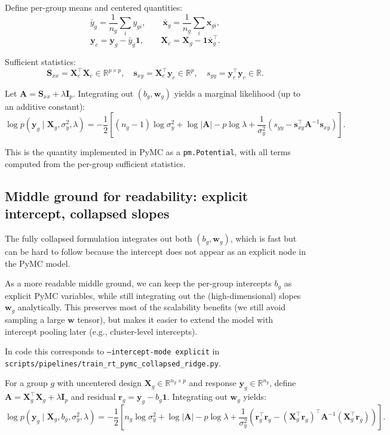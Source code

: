 \documentclass[11pt]{article}
\begin{document}
Define per-group means and centered quantities:
\[
  \bar{y}_g = \frac{1}{n_g}\sum_i y_{gi}, \qquad
  \bar{\bm{x}}_g = \frac{1}{n_g}\sum_i \bm{x}_{gi},
\]
\[
  \bm{y}_{c} = \bm{y}_g - \bar{y}_g \bm{1}, \qquad
  \bm{X}_{c} = \bm{X}_g - \bm{1}\bar{\bm{x}}_g^\top.
\]

Sufficient statistics:
\[
  \bm{S}_{xx} = \bm{X}_{c}^\top \bm{X}_{c} \in \mathbb{R}^{p\times p}, \quad
  \bm{s}_{xy} = \bm{X}_{c}^\top \bm{y}_{c} \in \mathbb{R}^{p}, \quad
  s_{yy} = \bm{y}_{c}^\top \bm{y}_{c} \in \mathbb{R}.
\]

Let $\bm{A} = \bm{S}_{xx} + \lambda \bm{I}_p$.
Integrating out $(b_g, \bm{w}_g)$ yields a marginal likelihood (up to an additive constant):
\[
  \log p(\bm{y}_g \mid \bm{X}_g, \sigma_y^2, \lambda)
  = -\frac{1}{2}\left[
    (n_g - 1)\log \sigma_y^2
    + \log|\bm{A}|
    - p\log \lambda
    + \frac{1}{\sigma_y^2}\left(s_{yy} - \bm{s}_{xy}^\top \bm{A}^{-1}\bm{s}_{xy}\right)
  \right].
\]

This is the quantity implemented in PyMC as a \texttt{pm.Potential}, with all terms computed from the per-group sufficient statistics.

\subsection{Middle ground for readability: explicit intercept, collapsed slopes}

The fully collapsed formulation integrates out both $(b_g, \bm{w}_g)$, which is fast but can be hard to follow because the intercept
does not appear as an explicit node in the PyMC model.

As a more readable middle ground, we can keep the per-group intercepts $b_g$ as explicit PyMC variables, while still integrating out
the (high-dimensional) slopes $\bm{w}_g$ analytically. This preserves most of the scalability benefits (we still avoid sampling a
large $\bm{w}$ tensor), but makes it easier to extend the model with intercept pooling later (e.g., cluster-level intercepts).

In code this corresponds to \texttt{--intercept-mode explicit} in
\texttt{scripts/pipelines/train\_rt\_pymc\_collapsed\_ridge.py}.

For a group $g$ with uncentered design $\bm{X}_g \in \mathbb{R}^{n_g \times p}$ and response $\bm{y}_g \in \mathbb{R}^{n_g}$,
define $\bm{A} = \bm{X}_g^\top \bm{X}_g + \lambda \bm{I}_p$ and residual $\bm{r}_g = \bm{y}_g - b_g\bm{1}$.
Integrating out $\bm{w}_g$ yields:
\[
  \log p(\bm{y}_g \mid \bm{X}_g, b_g, \sigma_y^2, \lambda)
  = -\frac{1}{2}\left[
    n_g \log \sigma_y^2
    + \log|\bm{A}|
    - p\log \lambda
    + \frac{1}{\sigma_y^2}\left(\bm{r}_g^\top \bm{r}_g - (\bm{X}_g^\top \bm{r}_g)^\top \bm{A}^{-1}(\bm{X}_g^\top \bm{r}_g)\right)
  \right].
\]
\end{document}

